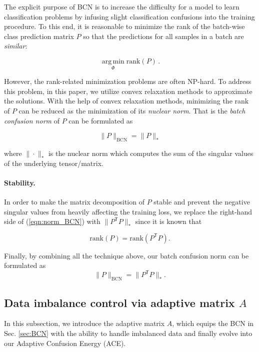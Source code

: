 \documentclass{article}
\def\argmin{\mathop{\mathrm{arg}\, \mathrm{min}}\limits}
\def\argmin{\mathop{\mathrm{arg}\, \mathrm{min}}\limits}
\begin{document}
The explicit purpose of BCN is to increase the difficulty for a model to learn classification problems by infusing slight classification confusions into the training procedure. To this end, it is reasonable to minimize the rank of the batch-wise class prediction matrix $P$ so that the predictions for all samples in a batch are {\em similar}:
\begin{linenomath}
\begin{equation}
    \argmin_\Phi \mathrm{rank} (P)\,.
    \label{eqn:rank_P}
\end{equation}
\end{linenomath}
However, the rank-related minimization problems are often NP-hard. To address this problem, in this paper, we utilize convex relaxation methods to approximate the solutions. With the help of convex relaxation methods, minimizing the rank of $P$ can be reduced as the minimization of its {\em nuclear norm}. That is the {\em batch confusion norm} of $P$ can be formulated as
\begin{linenomath}
\begin{equation}
    \| P \|_{\mathrm{BCN}} = \| P \|_*
    \label{eqn:norm_BCN}
\end{equation}
\end{linenomath}
where $\|\cdot \|_*$ is the nuclear norm which computes the sum of the singular values of the underlying tensor/matrix.

\paragraph{Stability.} In order to make the matrix decomposition of $P$ stable and prevent the negative singular values from heavily affecting the training loss, we replace the right-hand side of (\ref{eqn:norm_BCN}) with $\| P^\mathsf{T} P \|_*$ since it is known that
\begin{linenomath}
\begin{equation}
    \mathrm{rank}(P) = \mathrm{rank}(P^\mathsf{T} P).
    \label{eqn:rankPP}
\end{equation} 
\end{linenomath}

Finally, by combining all the technique above, our batch confusion norm can be formulated as 
\begin{equation}
    \| P \|_{\mathrm{BCN}} = \| P^\mathsf{T} P \|_*.
    \label{eqn:BCN}
\end{equation} 

\subsection{Data imbalance control via adaptive matrix $A$}
\label{sec:MA}
In this subsection, we introduce the adaptive matrix $A$, which equips the BCN in Sec. \ref{sec:BCN} with the ability to handle imbalanced data and finally evolve into our Adaptive Confusion Energy (ACE). 
\end{document}
